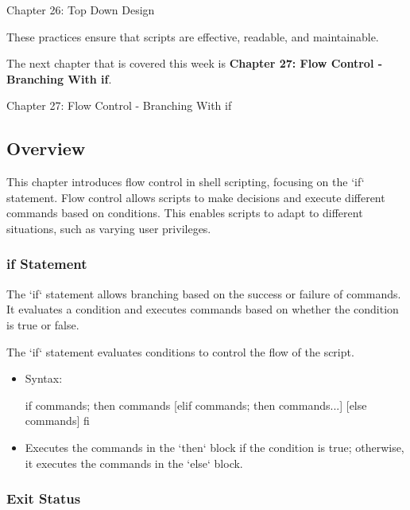 \begin{notes}{Chapter 26: Top Down Design}
\begin{highlight}
    These practices ensure that scripts are effective, readable, and maintainable.
    
    \end{highlight}
\end{notes}

The next chapter that is covered this week is \textbf{Chapter 27: Flow Control - Branching With if}.

\begin{notes}{Chapter 27: Flow Control - Branching With if}
    \subsection*{Overview}

    This chapter introduces flow control in shell scripting, focusing on the `if` statement. Flow control allows scripts to make decisions and execute different commands based on conditions. This 
    enables scripts to adapt to different situations, such as varying user privileges.
    
    \subsubsection*{if Statement}
    
    The `if` statement allows branching based on the success or failure of commands. It evaluates a condition and executes commands based on whether the condition is true or false.
    
    \begin{highlight}[if Statement]
    
    The `if` statement evaluates conditions to control the flow of the script.
    
    \begin{itemize}
        \item Syntax:
    \begin{code}[Shell]
    if commands; then
        commands
    [elif commands; then
        commands...]
    [else
        commands]
    fi
    \end{code}
        \item Executes the commands in the `then` block if the condition is true; otherwise, it executes the commands in the `else` block.
    \end{itemize}
    
    \end{highlight}
    
    \subsubsection*{Exit Status}
    

\end{notes}
